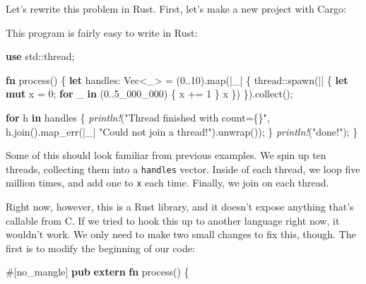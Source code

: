 \documentclass[a4paper,]{book}
\newenvironment{Shaded}{\begin{snugshade}}{\end{snugshade}}
\newcommand{\KeywordTok}[1]{\textcolor[rgb]{0.13,0.29,0.53}{\textbf{{#1}}}}
\newcommand{\DataTypeTok}[1]{\textcolor[rgb]{0.13,0.29,0.53}{{#1}}}
\newcommand{\DecValTok}[1]{\textcolor[rgb]{0.00,0.00,0.81}{{#1}}}
\newcommand{\StringTok}[1]{\textcolor[rgb]{0.31,0.60,0.02}{{#1}}}
\newcommand{\PreprocessorTok}[1]{\textcolor[rgb]{0.56,0.35,0.01}{\textit{{#1}}}}
\newcommand{\AttributeTok}[1]{\textcolor[rgb]{0.77,0.63,0.00}{{#1}}}
\newcommand{\NormalTok}[1]{{#1}}
\begin{document}
Let's rewrite this problem in Rust. First, let's make a new project with
Cargo:

\begin{Shaded}
\end{Shaded}

This program is fairly easy to write in Rust:

\begin{Shaded}
\begin{Highlighting}[]
\KeywordTok{use} \NormalTok{std::thread;}

\KeywordTok{fn} \NormalTok{process() \{}
    \KeywordTok{let} \NormalTok{handles: }\DataTypeTok{Vec}\NormalTok{<_> = (}\DecValTok{0.}\NormalTok{.}\DecValTok{10}\NormalTok{).map(|_| \{}
        \NormalTok{thread::spawn(|| \{}
            \KeywordTok{let} \KeywordTok{mut} \NormalTok{x = }\DecValTok{0}\NormalTok{;}
            \KeywordTok{for} \NormalTok{_ }\KeywordTok{in} \NormalTok{(}\DecValTok{0.}\NormalTok{.}\DecValTok{5_000_000}\NormalTok{) \{}
                \NormalTok{x += }\DecValTok{1}
            \NormalTok{\}}
            \NormalTok{x}
        \NormalTok{\})}
    \NormalTok{\}).collect();}

    \KeywordTok{for} \NormalTok{h }\KeywordTok{in} \NormalTok{handles \{}
        \PreprocessorTok{println!}\NormalTok{(}\StringTok{"Thread finished with count=\{\}"}\NormalTok{,}
        \NormalTok{h.join().map_err(|_| }\StringTok{"Could not join a thread!"}\NormalTok{).unwrap());}
    \NormalTok{\}}
    \PreprocessorTok{println!}\NormalTok{(}\StringTok{"done!"}\NormalTok{);}
\NormalTok{\}}
\end{Highlighting}
\end{Shaded}

Some of this should look familiar from previous examples. We spin up ten
threads, collecting them into a \texttt{handles} vector. Inside of each
thread, we loop five million times, and add one to \texttt{x} each time.
Finally, we join on each thread.

Right now, however, this is a Rust library, and it doesn't expose
anything that's callable from C. If we tried to hook this up to another
language right now, it wouldn't work. We only need to make two small
changes to fix this, though. The first is to modify the beginning of our
code:

\begin{Shaded}
\begin{Highlighting}[]
\AttributeTok{#[}\NormalTok{no_mangle}\AttributeTok{]}
\KeywordTok{pub} \KeywordTok{extern} \KeywordTok{fn} \NormalTok{process() \{}
\end{Highlighting}
\end{Shaded}
\end{document}
